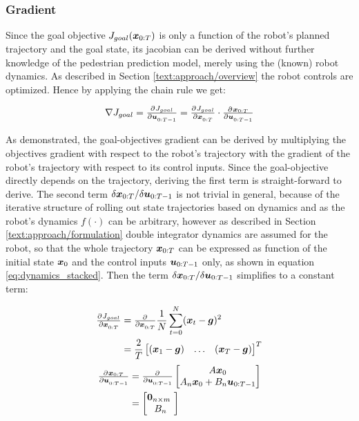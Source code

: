 \subsubsection{Gradient}
Since the goal objective $J_{goal}(\boldsymbol{x}_{0:T})$ is only a function of the robot's planned trajectory and the goal state, its jacobian can be derived without further knowledge of the pedestrian prediction model, merely using the (known) robot dynamics. As described in Section \ref{text:approach/overview} the robot controls are optimized. Hence by applying the chain rule we get: 

\begin{equation}
\nabla J_{goal} = \pd{J_{goal}}{\u_{0:T-1}} = \pd{J_{goal}}{\x_{0:T}} \cdot \pd{\x_{0:T}}{\u_{0:T-1}}
\end{equation}

As demonstrated, the goal-objectives gradient can be derived by multiplying the objectives gradient with respect to the robot's trajectory with the gradient of the robot's trajectory with respect to its control inputs. Since the goal-objective directly depends on the trajectory, deriving the first term is straight-forward to derive. The second term $\delta \boldsymbol{x}_{0:T} / \delta \boldsymbol{u}_{0:T-1}$ is not trivial in general, because of the iterative structure of rolling out state trajectories based on dynamics and as the robot's dynamics $f(\cdot)$ can be arbitrary, however as described in Section \ref{text:approach/formulation} double integrator dynamics are assumed for the robot, so that the whole trajectory $\boldsymbol{x}_{0:T}$ can be expressed as function of the initial state $\boldsymbol{x}_0$ and the control inputs $\boldsymbol{u}_{0:T-1}$ only, as shown in equation \ref{eq:dynamics_stacked}. Then the term $\delta \boldsymbol{x}_{0:T} / \delta \boldsymbol{u}_{0:T-1}$ simplifies to a constant term:

\begin{align}
\pd{J_{goal}}{\x_{0:T}} &= \pd{}{\x_{0:T}} \frac{1}{N} \sum_{t = 0}^N (\x_t - \boldsymbol{g})^2 \\
&= \frac{2}{T} \begin{bmatrix} (\x_1 - \boldsymbol{g}) & \hdots & (\x_T - \boldsymbol{g}) \end{bmatrix}^T
\end{align}
\begin{align}
\pd{\x_{0:T}}{\u_{0:T-1}} &= \pd{}{\u_{0:T-1}} \begin{bmatrix} A \x_0 \\ A_n \x_0 + B_n \u_{0:T-1} \end{bmatrix} \\
&= \begin{bmatrix} \boldsymbol{0}_{n \times m} \\ B_n \end{bmatrix}
\label{eq:goal_gradient_dynamics}
\end{align}

